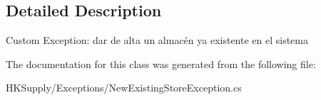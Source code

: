 \subsection{Detailed Description}
Custom Exception\+: dar de alta un almacén ya existente en el sistema 



The documentation for this class was generated from the following file\+:\begin{DoxyCompactItemize}
\item 
H\+K\+Supply/\+Exceptions/New\+Existing\+Store\+Exception.\+cs\end{DoxyCompactItemize}
